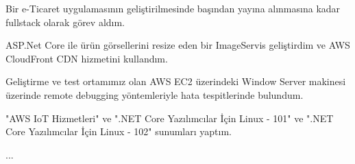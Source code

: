 \begin{cventries}
        {
            \begin{cvitems}
                \item { Bir e-Ticaret uygulamasının geliştirilmesinde başından yayına alınmasına kadar fullstack olarak  görev aldım. }
                \item { ASP.Net Core ile ürün görsellerini resize eden bir ImageServis geliştirdim ve AWS CloudFront CDN hizmetini kullandım. }
                \item { Geliştirme ve test ortamımız olan AWS EC2 üzerindeki Window Server makinesi üzerinde remote debugging yöntemleriyle hata tespitlerinde bulundum. }
                \item { "AWS IoT Hizmetleri" ve ".NET Core Yazılımcılar İçin Linux - 101" ve ".NET Core Yazılımcılar İçin Linux - 102" sunumları yaptım. }
            \end{cvitems}
        }

        {
            \begin{cvitems}
                \item { ... }
            \end{cvitems}
        }
        
\end{cventries}
